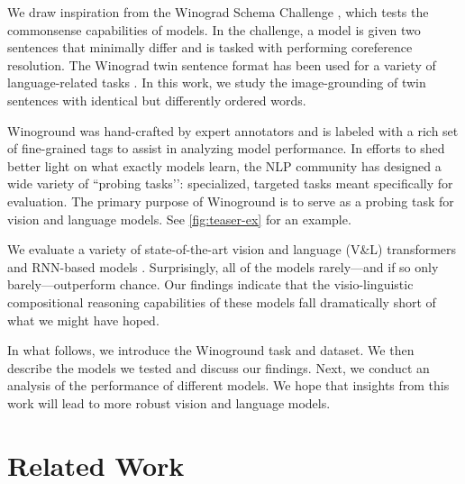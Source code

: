 \documentclass[10pt,twocolumn,letterpaper]{article}
\begin{document}
We draw inspiration from the Winograd Schema Challenge \cite{levesque2012winograd}, which tests the commonsense capabilities of models. In the challenge, a model is given two sentences that minimally differ and is tasked with performing coreference resolution. The Winograd twin sentence format has been used for a variety of language-related tasks \cite{rudinger2018gender, zhao2018gender, sakaguchi2020winogrande}.
In this work, we study the image-grounding of twin sentences with identical but differently ordered words.

Winoground was hand-crafted by expert annotators and is labeled with a rich set of fine-grained tags to assist in analyzing model performance. In efforts to shed better light on what exactly models learn, the NLP community has designed a wide variety of ``probing tasks’’: specialized, targeted tasks meant specifically for evaluation. The primary purpose of Winoground is to serve as a probing task for vision and language models. See \cref{fig:teaser-ex} for an example.

We evaluate a variety of state-of-the-art vision and language (V\&L) transformers \cite{gan2020villa,li2019visualbert,lu2019vilbert,hu2021unit,chen2020uniter,tan2020lxmert,radford2021clip,zhang2021vinvl,kim2021vilt,singh2022flava} and RNN-based models \cite{faghri2018vse,li2019vsrn}. Surprisingly,
all of the models rarely---and if so only barely---outperform chance. Our findings indicate that the visio-linguistic compositional reasoning capabilities of these models fall dramatically short of what we might have hoped.

In what follows, we introduce the Winoground task and dataset. We then describe the models we tested and discuss our findings. Next, we conduct an analysis of the performance of different models. We hope that insights from this work will lead to more robust vision and language models.

\section{Related Work}
\end{document}
